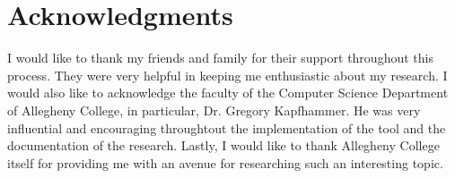 \section*{Acknowledgments}
I would like to thank my friends and family for their support throughout this process. They were very helpful in keeping me enthusiastic about my research. I would also like to acknowledge the faculty of the Computer Science Department of Allegheny College, in particular, Dr. Gregory Kapfhammer. He was very influential and encouraging throughtout the implementation of the tool and the documentation of the research. Lastly, I would like to thank Allegheny College itself for providing me with an avenue for researching such an interesting topic.
